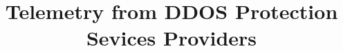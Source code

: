 \documentclass[letterpaper,twocolumn,10pt]{article}
\begin{document}
	
	\date{}
	
	\title{\Large \bf Telemetry from DDOS Protection Sevices Providers}
	
	\author{} %
	
	\maketitle





\end{document}
